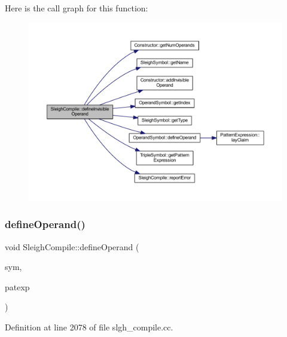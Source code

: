 Here is the call graph for this function\+:
\nopagebreak
\begin{figure}[H]
\begin{center}
\leavevmode
\includegraphics[width=350pt]{class_sleigh_compile_ab9d0f1be08e773533a23ef417399ac87_cgraph}
\end{center}
\end{figure}
\mbox{\label{class_sleigh_compile_a13ca459265a60fa719375491070a378c}} 
\subsubsection{\texorpdfstring{defineOperand()}{defineOperand()}}
{\footnotesize\ttfamily void Sleigh\+Compile\+::define\+Operand (\begin{DoxyParamCaption}\item[{\mbox{\hyperlink{class_operand_symbol}{Operand\+Symbol}} $\ast$}]{sym,  }\item[{\mbox{\hyperlink{class_pattern_expression}{Pattern\+Expression}} $\ast$}]{patexp }\end{DoxyParamCaption})}



Definition at line 2078 of file slgh\+\_\+compile.\+cc.

